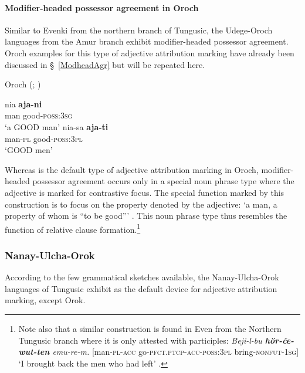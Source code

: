 \paragraph*{Modifier\hyp{}headed possessor agreement in Oroch}
Similar to Evenki from the northern branch of Tungusic, the Udege-Oroch languages from the Amur branch exhibit modifier\hyp{}headed possessor agreement. Oroch examples for this type of adjective attribution marking have already been discussed in \S~\ref{ModheadAgr} but will be repeated here.
\begin{exe}
\ex 
\label{oroch modhead}
\rm{Oroch (\citealt[207]{avrorin-etal1967}; \citealt[3]{malchukov2000})}
\begin{xlist}
\ex
\gll 	nia	\textbf{aja-ni}\\
	man good-\textsc{poss:3sg}\\
\glt	‘a GOOD man’
\ex
\gll nia-sa \textbf{aja-ti}\\	
	man-\textsc{pl} good-\textsc{poss:3pl}\\
\glt	‘GOOD men’
\end{xlist}
\end{exe}
Whereas  is the default type of adjective attribution marking in Oroch, modifier\hyp{}headed possessor agreement occurs only in a special noun phrase type where the adjective is marked for contrastive focus. The special function marked by this construction is to focus on the property denoted by the adjective: ‘a man, a property of whom is “to be good”’ \citep[3]{malchukov2000}. This noun phrase type thus resembles the function of relative clause formation.\footnote{Note also that a similar construction is found in Even from the Northern Tungusic branch where it is only attested with participles: \textit{Beji-l-bu \textbf{hör-če-wut-ten} emu-re-m.} [man-\textsc{pl}-\textsc{acc} go-\textsc{pfct.ptcp}-\textsc{acc}-\textsc{poss:3pl} bring-\textsc{nonfut}-\textsc{1sg}] ‘I brought back the men who had left’ \citep[31]{malchukov1995}.}

\subsubsection{Nanay-Ulcha-Orok}
According to the few grammatical sketches available, the Nanay-Ulcha-Orok languages of Tungusic exhibit  as the default device for adjective attribution marking, except Orok.

